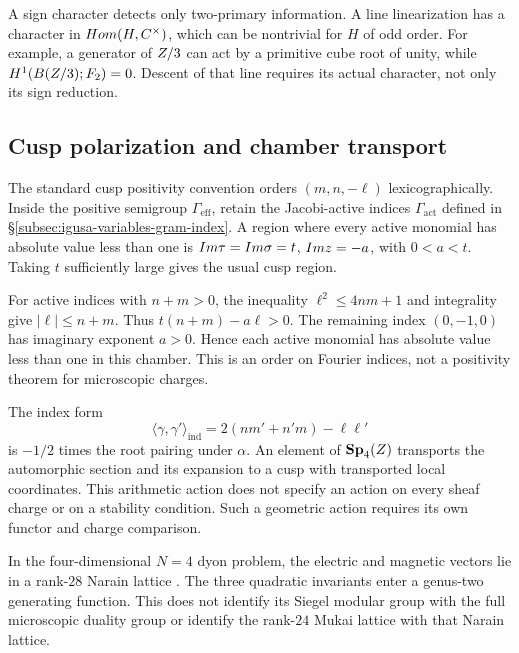 \begin{remark}
\label{rem:mod2-not-odd-order}
A sign character detects only two-primary information.  A line
linearization has a character in $Hom(H,C^\times)$, which can be
nontrivial for $H$ of odd order.  For example, a generator of
$Z/3$ can act by a primitive cube root of unity, while
$H^1(B(Z/3);F_2)=0$.  Descent of that line requires its
actual character, not only its sign reduction.
\end{remark}

\subsection{Cusp polarization and chamber transport}
\label{subsec:cusp-polarization-chamber}

\begin{definition}
\label{def:cusp-polarization}
The standard cusp positivity convention orders $(m,n,-\ell)$
lexicographically.  Inside the positive semigroup
$\Gamma_{\mathrm{eff}}$, retain the Jacobi-active indices
$\Gamma_{\mathrm{act}}$ defined in
\S\ref{subsec:igusa-variables-gram-index}.
A region where every active monomial has absolute value less than
one is $Im\tau=Im\sigma=t$, $Im z=-a$, with $0<a<t$.
Taking $t$ sufficiently large gives the usual cusp region.
\end{definition}

For active indices with $n+m>0$, the inequality
$\ell^2\le4nm+1$ and integrality give $|\ell|\le n+m$.
Thus $t(n+m)-a\ell>0$.  The remaining index $(0,-1,0)$ has
imaginary exponent $a>0$.  Hence each active monomial has absolute
value less than one in this chamber.  This is an order on Fourier
indices, not a positivity theorem for microscopic charges.

\begin{remark}
\label{rem:chamber-transport}
The index form
\[
\langle\gamma,\gamma'\rangle_{\mathrm{ind}}
=2(nm'+n'm)-\ell\ell'
\]
is $-1/2$ times the root pairing under $\alpha$.
An element of $\mathbf{Sp}_4(Z)$ transports the automorphic section and its
expansion to a cusp with transported local coordinates.
This arithmetic action does not specify an action on every sheaf
charge or on a stability condition.  Such a geometric action requires
its own functor and charge comparison.  

In the four-dimensional
$N=4$ dyon problem, the electric and magnetic vectors lie in a
rank-$28$ Narain lattice \cite[\S1]{DVV}.  The three quadratic
invariants enter a genus-two generating function.  This does not
identify its Siegel modular group with the full microscopic duality
group or identify the rank-$24$ Mukai lattice with that Narain lattice.
\end{remark}

